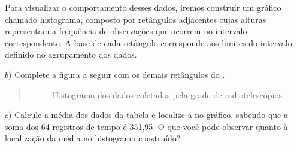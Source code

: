 Para visualizar o comportamento desses dados, iremos construir um gráfico chamado histograma, composto por retângulos adjacentes cujas alturas representam a frequência de observações que ocorrem no intervalo correspondente. A base de cada retângulo corresponde aos limites do intervalo definido no agrupamento dos dados.

\(b)\) Complete a figura a seguir com os demais retângulos do {\hyperref[\detokenize{PE103-3:fig-histograma}]{}}.
\begin{quote}

\begin{figure}[H]
\centering
\capstart

\noindent{}
\caption{Histograma dos dados coletados pela grade de radiotelescópios}\label{\detokenize{PE103-3:fig-histograma}}\label{\detokenize{PE103-3:id2}}\end{figure}
\end{quote}

\(c)\) Calcule a média dos dados da tabela e localize-a no gráfico, sabendo que a soma dos 64 registros de tempo é 351,95. O que você pode observar quanto à localização da média no histograma construído?



